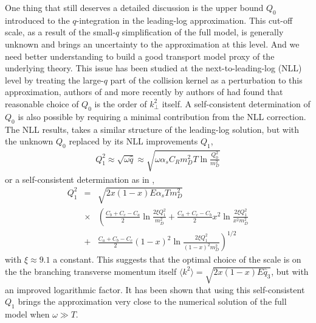 One thing that still deserves a detailed discussion is the upper bound $Q_0$ introduced to the $q$-integration in the leading-log approximation.
This cut-off scale, as a result of the small-$q$ simplification of the full model, is generally unknown and brings an uncertainty to the approximation at this level.
And we need better understanding to build a good transport model proxy of the underlying theory.
This issue has been studied at the next-to-leading-log (NLL) level by treating the large-$q$ part of the collision kernel as a perturbation to this approximation, authors of \cite{Arnold:2008zu} and more recently by authors of \cite{Mehtar-Tani:2019tvy} had found that reasonable choice of $Q_0$ is the order of $k_\perp^2$ itself.
A self-consistent determination of $Q_0$ is also possible by requiring a minimal contribution from the NLL correction.
The NLL results, takes a similar structure of the leading-log solution, but with the unknown $Q_0$ replaced by its NLL improvements $Q_{1}$,
\begin{eqnarray}
Q_1^2  \approx \sqrt{\omega \hat{q}} \approx \sqrt{\omega \alpha_s C_R m_D^2 T \ln\frac{Q_0^2}{m_D^2}}
\label{eq:Q1}
\end{eqnarray}
or a self-consistent determination as in \cite{Arnold:2008zu},
\begin{eqnarray}
Q_1^2 &=& \sqrt{2 x (1-x) E \alpha_s T m_D^2}\\\nonumber
&\times & \left(
\frac{C_b+C_c-C_a}{2}\ln\frac{2\xi Q_1^2}{m_D^2} + \frac{C_a+C_c-C_b}{2} x^2 \ln\frac{2\xi Q_1^2}{x^2 m_D^2} \right.\\\nonumber 
&+& \left.\frac{C_a+C_b-C_c}{2} (1-x)^2 \ln\frac{2\xi Q_1^2}{(1-x)^2 m_D^2} \right)^{1/2}
\label{eq:Q1-sf}
\end{eqnarray}
with $\xi \approx 9.1$ a constant. 
This suggests that the optimal choice of the scale is on the the branching transverse momentum itself $\langle k^2 \rangle = \sqrt{2x(1-x)E\hat{q}_3}$, but with an improved logarithmic factor.
It has been shown that using this self-consistent $Q_1$ brings the approximation very close to the numerical solution of the full model when $\omega \gg T$.

